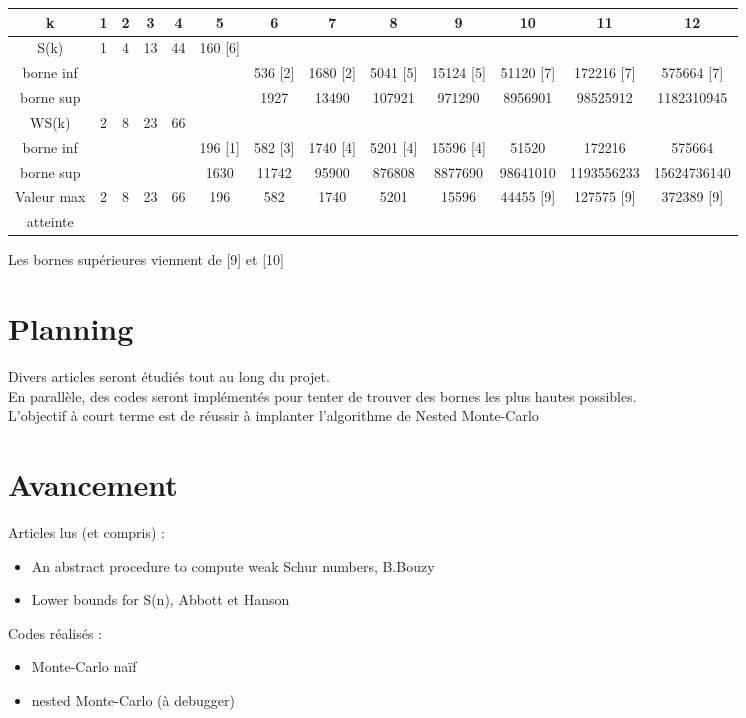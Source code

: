 \documentclass{report}
\begin{document}
\begin{tabular}{c|c|c|c|c|c|c|c|c|c|c|c|c}
    \hline
    k & 1 & 2 & 3 & 4 & 5 & 6 & 7 & 8 & 9 & 10 & 11 & 12 \\ \hline
    S(k) & 1 & 4 & 13 & 44 & 160 [6] &  &  &  &  &  &  & \\
    borne inf &  &  &  &  &  & 536 [2] & 1680 [2] & 5041 [5] & 15124 [5] & 51120 [7] & 172216 [7] & 575664 [7] \\ 
    borne sup &  &  &  &  &  & 1927 & 13490 & 107921 & 971290 & 8956901 & 98525912 & 1182310945 \\ \hline
    WS(k) & 2 & 8 & 23 & 66 &  &  &  &  &  &  &  &  \\ 
    borne inf &  &  &  &  & 196 [1] & 582 [3] & 1740 [4] & 5201 [4] & 15596 [4] & 51520 & 172216 & 575664 \\
    borne sup &  &  &  &  & 1630 & 11742 & 95900 & 876808 & 8877690 & 98641010 & 1193556233 & 15624736140 \\ \hline
    
    Valeur max & 2 & 8 & 23 & 66 & 196 & 582 & 1740 & 5201 & 15596 & 44455 [9] & 127575 [9] & 372389 [9] \\ 
    atteinte &  &  &  &  &  &  &  &  &  &  &  &  \\ \hline
    
\end{tabular}

Les bornes supérieures viennent de [9] et [10]

\section{Planning}

Divers articles seront étudiés tout au long du projet.
\\ En parallèle, des codes seront implémentés pour tenter de trouver des bornes les plus hautes possibles.
\\ L'objectif à court terme est de réussir à implanter l'algorithme de Nested Monte-Carlo 

\section{Avancement}

Articles lus (et compris) : 
\begin{itemize}
    \item An abstract procedure to compute weak Schur numbers, B.Bouzy
    \item Lower bounds for S(n), Abbott et Hanson
\end{itemize}
Codes réalisés : 
\begin{itemize}
    \item Monte-Carlo naïf
    \item nested Monte-Carlo (à debugger)
\end{itemize}
\end{document}
